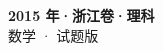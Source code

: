 \documentclass[zihao=-4, a4paper]{ctexart}
\begin{document}
\begin{center}
  {\Large\bfseries 2015 年·浙江卷·理科}\\[4pt]
  {\large 数学 · 试题版}
\end{center}
\medskip
{}

\end{document}

